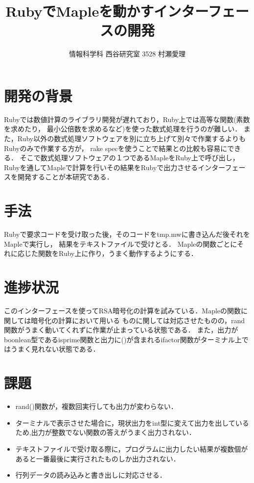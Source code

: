\documentclass[10pt,a4j,twocolumn]{jsarticle}
\begin{document}
\title{RubyでMapleを動かすインターフェースの開発}
\author{情報科学科 西谷研究室 3528 村瀬愛理}
\date{}
\maketitle
\section{開発の背景}
Rubyでは数値計算のライブラリ開発が遅れており，Ruby上では高等な関数(素数を求めたり，
最小公倍数を求めるなど)を使った数式処理を行うのが難しい．
また，Ruby以外の数式処理ソフトウェアを別に立ち上げて別々で作業するよりもRubyのみで作業する方が，
rake specを使うことで結果との比較も容易にできる．
そこで数式処理ソフトウェアの１つであるMapleをRuby上で呼び出し，
Rubyを通してMapleで計算を行いその結果をRubyで出力させるインターフェースを開発することが本研究である．

\section{手法}
Rubyで要求コードを受け取った後，そのコードをtmp.mwに書き込んだ後それをMapleで実行し，
結果をテキストファイルで受けとる．
Mapleの関数ごとにそれに応じた関数をRuby上に作り，うまく動作するようにする．

\section{進捗状況}
このインターフェースを使ってRSA暗号化の計算を試みている．Mapleの関数に関しては暗号化の計算において用いる
ものに関しては対応させたものの，rand関数がうまく動いてくれずに作業が止まっている状態である．
また，出力がboonlean型であるisprime関数と出力に()が含まれるifactor関数がターミナル上ではうまく見れない状態である．

\section{課題}\begin{itemize}
\item rand()関数が，複数回実行しても出力が変わらない．
\item ターミナルで表示させた場合に，現状出力をint型に変えて出力を出しているため,出力が整数でない関数の答えがうまく出力されない．
\item テキストファイルで受け取る際に，プログラムに出力したい結果が複数個があると一番最後に実行されたものしか出力されない．
\item 行列データの読み込みと書き出しに対応させる．
\end{itemize}
\end{document}
